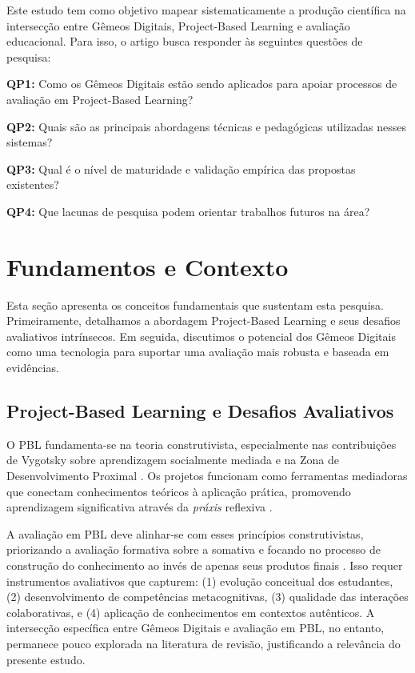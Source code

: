 \documentclass[english, spanish, brazilian]{RBIEarticle} %
\begin{document}
Este estudo tem como objetivo mapear sistematicamente a produção científica na intersecção entre Gêmeos Digitais, Project-Based Learning e avaliação educacional. Para isso, o artigo busca responder às seguintes questões de pesquisa:

\textbf{QP1:} Como os Gêmeos Digitais estão sendo aplicados para apoiar processos de avaliação em Project-Based Learning?

\textbf{QP2:} Quais são as principais abordagens técnicas e pedagógicas utilizadas nesses sistemas?

\textbf{QP3:} Qual é o nível de maturidade e validação empírica das propostas existentes?

\textbf{QP4:} Que lacunas de pesquisa podem orientar trabalhos futuros na área?

\section{Fundamentos e Contexto}

Esta seção apresenta os conceitos fundamentais que sustentam esta pesquisa. Primeiramente, detalhamos a abordagem Project-Based Learning e seus desafios avaliativos intrínsecos. Em seguida, discutimos o potencial dos Gêmeos Digitais como uma tecnologia para suportar uma avaliação mais robusta e baseada em evidências.

\subsection{Project-Based Learning e Desafios Avaliativos}

O PBL fundamenta-se na teoria construtivista, especialmente nas contribuições de Vygotsky sobre aprendizagem socialmente mediada e na Zona de Desenvolvimento Proximal \parencite{Vygotsky1978}. Os projetos funcionam como ferramentas mediadoras que conectam conhecimentos teóricos à aplicação prática, promovendo aprendizagem significativa através da \textit{práxis} reflexiva \parencite{Dewey1938}.

A avaliação em PBL deve alinhar-se com esses princípios construtivistas, priorizando a avaliação formativa sobre a somativa e focando no processo de construção do conhecimento ao invés de apenas seus produtos finais \parencite{Stiggins2005}. Isso requer instrumentos avaliativos que capturem: (1) evolução conceitual dos estudantes, (2) desenvolvimento de competências metacognitivas, (3) qualidade das interações colaborativas, e (4) aplicação de conhecimentos em contextos autênticos. A intersecção específica entre Gêmeos Digitais e avaliação em PBL, no entanto, permanece pouco explorada na literatura de revisão, justificando a relevância do presente estudo.
\end{document}
